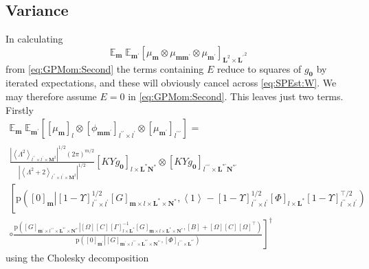 \documentclass[preprint,12pt]{elsarticle}
\newcommand*{\M}[1]{\ensuremath{#1}\xspace}
\newcommand*{\x}{\times}
\newcommand*{\mi}[1]{\mathbf{#1}}
\newcommand*{\te}[2][]{\left\lbrack{#2}\right\rbrack_{#1}}
\newcommand*{\diag}[2][]{\left\langle{#2}\right\rangle_{#1}}
\newcommand*{\prob}[3]{\M{\mathrm{p}\!\left(\left.{#1}\right\vert{#2,#3}\right)}}
\newcommand*{\evt}[3][]{\mathbb{E}_{#3}^{#1}\!#2}
\newcommand*{\modulus}[1]{\M{\left\lvert{#1}\right\rvert}}
\begin{document}
    \subsection{Variance}\label{sub:GPEst:Variance}
        In calculating
        \begin{equation*}
            \evt{\;\evt{\te[\mi{L}^{2} \x \mi{L^{\prime}}^{2}]{\mu_{\mi{m}} \otimes \mu_{\mi{mm^{\prime}}} \otimes \mu_{\mi{m^{\prime}}}}}{\mi{m^{\prime}}}}{\mi{m}}
        \end{equation*}
        from \cref{eq:GPMom:Second} the terms containing $E$ reduce to squares of $g_{\mi{0}}$ by iterated expectations, and these will obviously cancel across \cref{eq:SPEst:W}. 
        We may therefore assume $E=0$ in \cref{eq:GPMom:Second}. This leaves just two terms.
        Firstly
        \begin{multline*}
            \evt{\;\evt{\te[]{\te[l]{\mu_{\mi{m}}} \otimes \te[l^{\prime\prime}\x l^{\prime}]{\phi_{\mi{mm^{\prime}}}} \otimes \te[l^{\prime\prime\prime}]{\mu_{\mi{m^{\prime}}}}}}{\mi{m^{\prime}}}}{\mi{m}} = \\
            \frac
            {\modulus{\diag[l^{\prime\prime}\x l^{\prime}\x\mi{M}^{2}]{\Lambda^{2}}}^{1/2}(2\pi)^{m/2}}
            {\modulus{\diag[l^{\prime\prime}\x l^{\prime}\x\mi{M}^2]{\Lambda^{2}+2}}^{1/2}}
            \te[l\x\mi{L^{*}N^{*}}]{KY\!g_{\mi{0}}} \otimes
            \te[l^{\prime\prime\prime}\x\mi{L^{*\prime}N^{*\prime}}]{KY\!g_{\mi{0}}} \\
            \left\lbrack
            \prob{\te[\mi{m}]{0}}{\te[l^{\prime\prime}\x l^{\prime}]{1-\Upsilon}^{1/2} \te[\mi{m}\x l\x \mi{L^{*}\x N^{*}}]{G}} 
            {\diag[]{1} -
            \te[l^{\prime\prime}\x l^{\prime}]{1-\Upsilon}^{1/2} \te[l\x \mi{L^{*}}]{\Phi}\te[l^{\prime\prime}\x l^{\prime}]{1-\Upsilon}^{\intercal/2}} \phantom{\frac{_{\vert}^{\vert}}{_{\vert}^{\vert}}} \right.\\
            \left. \circ 
                \frac{
                    \prob{\te[\mi{m^{\prime}}\x l^{\prime\prime\prime}\x \mi{L^{*\prime}\x N^{*\prime}}]{G}}
                    {\te[]{\Omega} \te[]{C} \te[l\x \mi{L^{*}}]{\Gamma}^{-1} \te[\mi{m}\x l\x \mi{L^{*}\x N^{*}}]{G}}{\te[]{B}+\te[]{\Omega} \te[]{C} \te[]{\Omega}^{\intercal}}}
                    {\prob{\te[\mi{m^{\prime}}]{0}}{\te[\mi{m^{\prime}}\x l^{\prime\prime\prime}\x \mi{L^{*\prime}\x N^{*\prime}}]{G}}{\te[l^{\prime\prime\prime}\x \mi{L^{*\prime}}]{\Phi}}}
            \right\rbrack^{\dagger}
        \end{multline*}
        using the Cholesky decomposition
\end{document}
